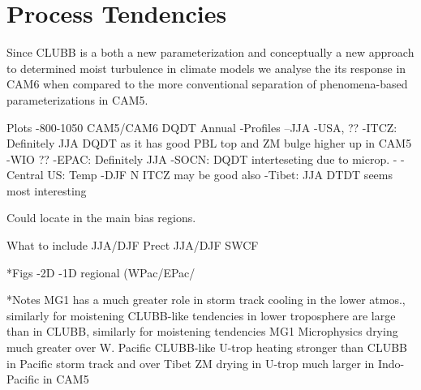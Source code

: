 \section{Process Tendencies}
\label{sec:tendencies}

Since CLUBB is a both a new parameterization and conceptually a new approach to determined moist turbulence in climate models we analyse the its response in CAM6 when compared to the more conventional separation of phenomena-based parameterizations in CAM5. 

Plots
-800-1050 CAM5/CAM6 DQDT Annual
-Profiles
--JJA
-USA, ??
-ITCZ: Definitely JJA  DQDT as it has good PBL top and ZM bulge higher up in CAM5
-WIO ??
-EPAC: Definitely JJA 
-SOCN: DQDT interteseting due to microp.
-
-Central US: Temp
-DJF N ITCZ may be good also
-Tibet: JJA DTDT seems most interesting


Could locate in the main bias regions.


What to include
JJA/DJF Prect
JJA/DJF SWCF


*Figs
-2D
-1D regional (WPac/EPac/

*Notes
MG1 has a much greater role in storm track cooling in the lower atmos., similarly for moistening
CLUBB-like tendencies in lower troposphere are large than in CLUBB, similarly for moistening tendencies
MG1 Microphysics drying much greater over W. Pacific
CLUBB-like U-trop heating stronger than CLUBB in Pacific storm track and over Tibet
ZM drying in U-trop much larger in Indo-Pacific in CAM5

